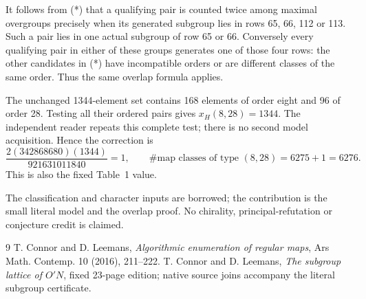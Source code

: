 \documentclass[11pt,a4paper]{article}
\begin{document}
It follows from (*) that a qualifying pair is counted twice among
maximal overgroups precisely when its generated subgroup lies in
rows 65, 66, 112 or 113. Such a pair lies in one actual subgroup of
row 65 or 66. Conversely every qualifying pair in either of these
groups generates one of those four rows: the other candidates in
(*) have incompatible orders or are different classes of the same
order. Thus the same overlap formula applies.

The unchanged 1344-element set contains 168 elements of order eight
and 96 of order 28. Testing all their ordered pairs gives
$x_H(8,28)=1344$. The independent reader repeats this complete test;
there is no second model acquisition. Hence the correction is
\[
 \frac{2(342868680)(1344)}{921631011840}=1,
 \qquad \#\text{map classes of type }(8,28)=6275+1=6276.
\]
This is also the fixed Table~1 value.

The classification and character inputs are
borrowed; the contribution is the small literal model and the overlap
proof. No chirality, principal-refutation or conjecture credit is claimed.
\begin{thebibliography}{9}
 T. Connor and D. Leemans, \emph{Algorithmic enumeration
of regular maps}, Ars Math. Contemp. 10 (2016), 211--222.
 T. Connor and D. Leemans, \emph{The subgroup lattice
of $O'N$}, fixed 23-page edition; native source joins accompany the
literal subgroup certificate.
\end{thebibliography}
\end{document}
